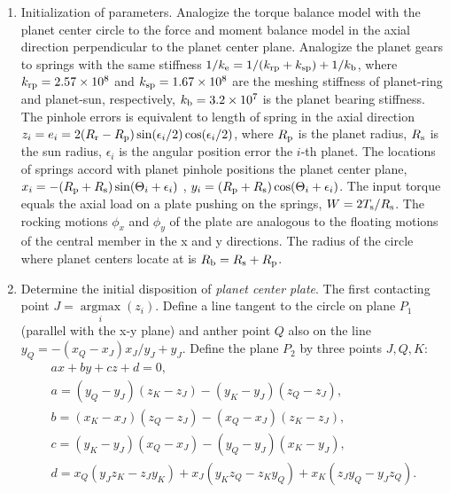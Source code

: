 \documentclass[a4paper,fleqn]{cas-sc}%
\begin{document}
\begin{enumerate}
    \item Initialization of parameters. Analogize the torque balance model with the planet center circle to the force and moment balance model in the axial direction perpendicular to the planet center plane.  Analogize the planet gears to springs with the same stiffness $1/k_{\rm e}=1/(k_{\rm rp}+k_{\rm sp})+1/k_{\rm b}$, where $k_{\rm rp}=2.57\times 10^8$ and $k_{\rm sp}=1.67\times 10^8$ are the meshing stiffness of planet-ring and planet-sun, respectively, $k_{\rm b}=3.2\times 10^7$ is the planet bearing stiffness. The pinhole errors is equivalent to length of spring in the axial direction $z_i=e_i=2(R_{\rm r}-R_{\rm p})\sin(\epsilon_i/2)\cos(\epsilon_i/2)$, where $R_{\rm p}$ is the planet radius, $R_{\rm s}$ is the sun radius, $\epsilon_{i}$ is the angular position error the $i$-th planet. The locations of springs accord with planet pinhole positions the planet center plane, $x_i=-(R_{\rm p}+R_{\rm s})\sin(\Theta_i+\epsilon_i)$ , $y_i=(R_{\rm p}+R_{\rm s})\cos(\Theta_i+\epsilon_i)$. The input torque equals the axial load on a plate pushing on the springs, $W=2T_{\rm s}/R_{\rm s}$.  The rocking motions $\phi_x$ and $\phi_y$ of the plate are analogous to the floating motions of the central member in the x and y directions. The radius of the circle where planet centers locate at is $R_{\rm b}=R_{\rm s}+R_{\rm p}$.
    \item Determine the initial disposition of \textit{planet center plate}. The first contacting point $J=\mathop{\arg\max}\limits_{i}(z_i)$. Define a line  tangent to the circle on plane  $P_1$ (parallel with the x-y plane) and anther point $Q$ also on the line $y_Q=-(x_Q-x_J)x_J/y_J+y_J$. Define the plane $P_2$ by three points $J, Q, K$:
    \begin{equation}
        \begin{split}
        a x+ b y+ c z+ d=0,\\
        a= \left(y_Q-y_J\right)\left(z_K-z_J\right)-\left(y_K-y_J\right) \left(z_Q-z_J\right),\\
        b=\left(x_K-x_J\right) \left(z_Q-z_J\right)-\left(x_Q-x_J\right) \left(z_K-z_J\right),\\
        c=\left(y_K-y_J\right) \left(x_Q-x_J\right)-\left(y_Q-y_J\right) \left(x_K-y_J\right),\\
        d=x_Q \left(y_J z_K-z_J y_K\right)+x_J \left(y_K z_Q-z_K y_Q\right)+x_K \left(z_J y_Q-y_J z_Q\right).
        \end{split} 
    \end{equation}

\end{enumerate}
\end{document}
